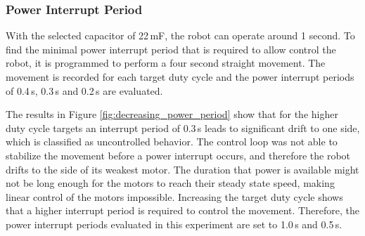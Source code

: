 \subsubsection{Power Interrupt Period}

With the selected capacitor of 22\,mF, the robot can operate around 1 second. 
To find the minimal power interrupt period that is required to allow control the robot, it is programmed to perform a four second straight movement.
The movement is recorded for each target duty cycle and the power interrupt periods of 0.4\,s, 0.3\,s and 0.2\,s are evaluated.

The results in Figure \ref{fig:decreasing_power_period} show that for the higher duty cycle targets an interrupt period of 0.3\,s leads to significant drift to one side, which is classified as uncontrolled behavior.
The control loop was not able to stabilize the movement before a power interrupt occurs, and therefore the robot drifts to the side of its weakest motor.
The duration that power is available might not be long enough for the motors to reach their steady state speed, making linear control of the motors impossible.
Increasing the target duty cycle shows that a higher interrupt period is required to control the movement. 
Therefore, the power interrupt periods evaluated in this experiment are set to 1.0\,s and 0.5\,s.


